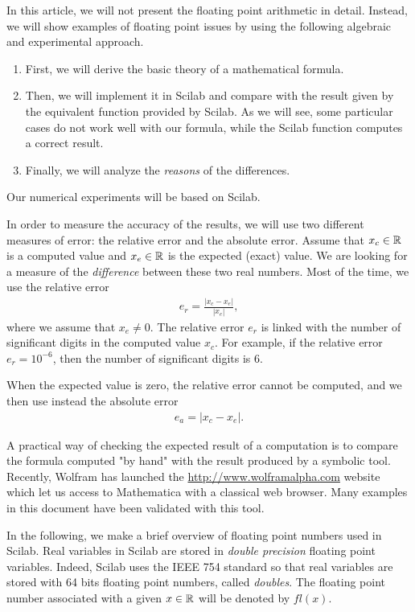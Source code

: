In this article, we will not present the floating point arithmetic in 
detail. Instead, we will show examples of floating point issues by 
using the following algebraic and experimental approach.
\begin{enumerate}
\item First, we will derive the basic theory of a mathematical formula. 
\item Then, we will implement it in Scilab and compare with the 
result given by the equivalent function provided by Scilab.
As we will see, some particular cases do not work well
with our formula, while the Scilab function computes a correct
result.
\item Finally, we will analyze the \emph{reasons} of the differences.
\end{enumerate}
Our numerical experiments will be based on Scilab.

In order to measure the accuracy of the results, we will use 
two different measures of error: the relative error and the 
absolute error\cite{Higham:2002:ASN}. 
Assume that $x_c\in\mathbb{R}$ is a computed value and 
$x_e\in\mathbb{R}$ is the expected (exact) value. We are looking for 
a measure of the \emph{difference} between these two real numbers. 
Most of the time, we use the relative error 
\begin{eqnarray}
e_r=\frac{|x_c-x_e|}{|x_e|},
\end{eqnarray}
where we assume that $x_e\neq 0$. The relative error $e_r$ is linked with the number of significant 
digits in the computed value $x_c$. For example, if the relative 
error $e_r=10^{-6}$, then the number of significant digits is 6.

When the expected value is zero, the relative error cannot 
be computed, and we then use instead the absolute error  
\begin{eqnarray}
e_a=|x_c-x_e|.
\end{eqnarray}

A practical way of checking the expected result of a computation
is to compare the formula computed "by hand" with the result 
produced by a symbolic tool. Recently, Wolfram has launched the 
\url{http://www.wolframalpha.com}
website which let us access to Mathematica with a classical web browser.
Many examples in this document have been validated with this tool.

In the following, we make a brief overview of floating point numbers used in Scilab.
Real variables in Scilab are stored in 
\emph{double precision} floating point variables. Indeed, Scilab uses the IEEE 754 standard so that real 
variables are stored with 64 bits floating point numbers, called \emph{doubles}.
The floating point number associated with a given $x\in\mathbb{R}$ will be 
denoted by $fl(x)$.

